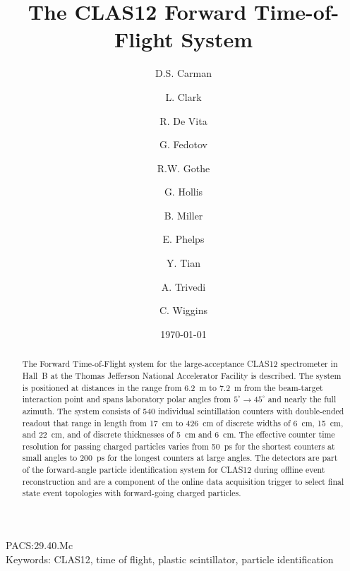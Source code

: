 \documentclass[final,3p,twocolumn]{elsarticle}
\begin{document}
\begin{frontmatter}

\title{The CLAS12 Forward Time-of-Flight System}

\author[JLab]{D.S. Carman}
\author[Glasgow]{L. Clark}
\author[INFN]{R. De Vita}
\author[USC]{G. Fedotov}
\author[USC]{R.W. Gothe}
\author[USC]{G. Hollis}
\author[JLab]{B. Miller}
\author[USC]{E. Phelps}
\author[USC]{Y. Tian}
\author[USC]{A. Trivedi}
\author[JLab]{C. Wiggins}

\address[JLab]{Thomas Jefferson National Accelerator Facility, Newport News, VA 23606, USA}
\address[USC]{University of South Carolina, Columbia, SC 29208, USA}
\address[Glasgow]{University of Glasgow, Glasgow G12 8QQ, United Kingdom}
\address[INFN]{INFN, Sezione di Genova, 16146 Genova, Italy}

\date{\today}


\begin{abstract}
The Forward Time-of-Flight system for the large-acceptance CLAS12 spectrometer in Hall~B at the
Thomas Jefferson National Accelerator Facility is described. The system is positioned at distances
in the range from 6.2~m to 7.2~m from the beam-target interaction point and spans laboratory polar
angles from $5^\circ \to 45^\circ$ and nearly the full azimuth. The system consists of 540 individual
scintillation counters with double-ended readout that range in length from 17~cm to 426~cm of
discrete widths of 6~cm, 15~cm, and 22~cm, and of discrete thicknesses of 5~cm and 6~cm. The
effective counter time resolution for passing charged particles varies from 50~ps for the shortest
counters at small angles to 200~ps for the longest counters at large angles. The detectors are part
of the forward-angle particle identification system for CLAS12 during offline event reconstruction
and are a component of the online data acquisition trigger to select final state event topologies with
forward-going charged particles.
\end{abstract}

\end{frontmatter}

PACS:29.40.Mc \\
Keywords: CLAS12, time of flight, plastic scintillator, particle identification
\end{document}

